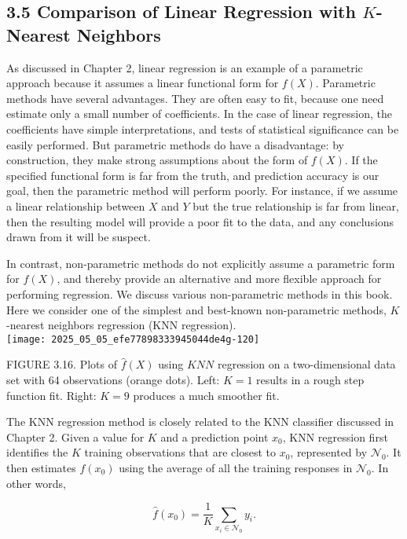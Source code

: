 \documentclass[10pt]{article}
\begin{document}
\subsection*{3.5 Comparison of Linear Regression with $K$-Nearest Neighbors}
As discussed in Chapter 2, linear regression is an example of a parametric approach because it assumes a linear functional form for $f(X)$. Parametric methods have several advantages. They are often easy to fit, because one need estimate only a small number of coefficients. In the case of linear regression, the coefficients have simple interpretations, and tests of statistical significance can be easily performed. But parametric methods do have a disadvantage: by construction, they make strong assumptions about the form of $f(X)$. If the specified functional form is far from the truth, and prediction accuracy is our goal, then the parametric method will perform poorly. For instance, if we assume a linear relationship between $X$ and $Y$ but the true relationship is far from linear, then the resulting model will provide a poor fit to the data, and any conclusions drawn from it will be suspect.

In contrast, non-parametric methods do not explicitly assume a parametric form for $f(X)$, and thereby provide an alternative and more flexible approach for performing regression. We discuss various non-parametric methods in this book. Here we consider one of the simplest and best-known non-parametric methods, $K$-nearest neighbors regression (KNN regression).\\
\texttt{[image: 2025\_05\_05\_efe77898333945044de4g-120]}

FIGURE 3.16. Plots of $\hat{f}(X)$ using $K N N$ regression on a two-dimensional data set with 64 observations (orange dots). Left: $K=1$ results in a rough step function fit. Right: $K=9$ produces a much smoother fit.

The KNN regression method is closely related to the KNN classifier discussed in Chapter 2. Given a value for $K$ and a prediction point $x_{0}$, KNN regression first identifies the $K$ training observations that are closest to $x_{0}$, represented by $\mathcal{N}_{0}$. It then estimates $f\left(x_{0}\right)$ using the average of all the training responses in $\mathcal{N}_{0}$. In other words,

$$
\hat{f}\left(x_{0}\right)=\frac{1}{K} \sum_{x_{i} \in \mathcal{N}_{0}} y_{i} .
$$
\end{document}
